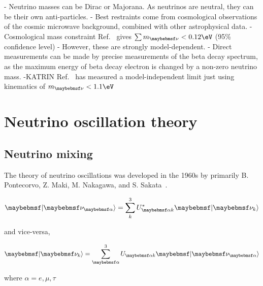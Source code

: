 - Neutrino masses can be Dirac or Majorana. As neutrinos are neutral, they can be their own
anti-particles.
- Best restraints come from cosmological observations of the cosmic microwave background, combined
with other astrophysical data.
-Cosmological mass constraint Ref.~\cite{planck2018} gives $\sum m_{\nu} < 0.12 \eV$ (95\%
confidence level)
- However, these are strongly model-dependent.
- Direct measurements can be made by precise measurements of the beta decay spectrum, as the
maximum energy of  beta decay electron is changed by a non-zero neutrino mass.
-KATRIN Ref.~\cite{aker2019} has measured a model-independent limit just using
kinematics of $m_{\nu} < 1.1 \eV$

\section{Neutrino oscillation theory}
\label{sec:theory_oscillations}

\subsection{Neutrino mixing}

The theory of neutrino oscillations was developed in the 1960s by primarily B. Pontecorvo, Z. Maki,
M. Nakagawa, and S. Sakata~\cite{maki1962, pontecorvo1967, pontecorvo1969}.

\begin{equation} %
    \ket{\nu_{\alpha}}=\sum_{k}^{3}U_{\alpha k}^{*}\ket{\nu_{k}}
\end{equation} %

and vice-versa,

\begin{equation} %
    \ket{\nu_{k}}=\sum_{\alpha}^{3}U_{\alpha k}\ket{\nu_{\alpha}}
\end{equation} %


where $\alpha = e, \mu, \tau$

